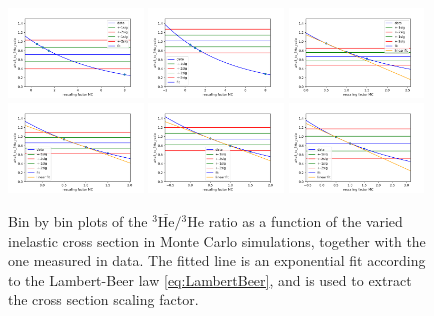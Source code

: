 \begin{figure}
    \centering
    \includegraphics[width=0.32\textwidth]{figures/he3_rescaling/Bin_2_scaling.png}
    \includegraphics[width=0.32\textwidth]{figures/he3_rescaling/Bin_3_scaling.png}
    \includegraphics[width=0.32\textwidth]{figures/he3_rescaling/Bin_4_scaling.png}
    \includegraphics[width=0.32\textwidth]{figures/he3_rescaling/Bin_5_scaling.png}
    \includegraphics[width=0.32\textwidth]{figures/he3_rescaling/Bin_6_scaling.png}
    \includegraphics[width=0.32\textwidth]{figures/he3_rescaling/Bin_7_scaling.png}
    \caption{Bin by bin plots of the $^3\overline{\mathrm{He}}/{^3\mathrm{He}}$ ratio as a function of the varied inelastic cross section in Monte Carlo simulations, together with the one measured in data. The fitted line is an exponential fit according to the Lambert-Beer law \ref{eq:LambertBeer}, and is used to extract the cross section scaling factor.}
    \label{fig:Meth:RatiosAsFunctionsOfSigmaInel3He}
\end{figure}

